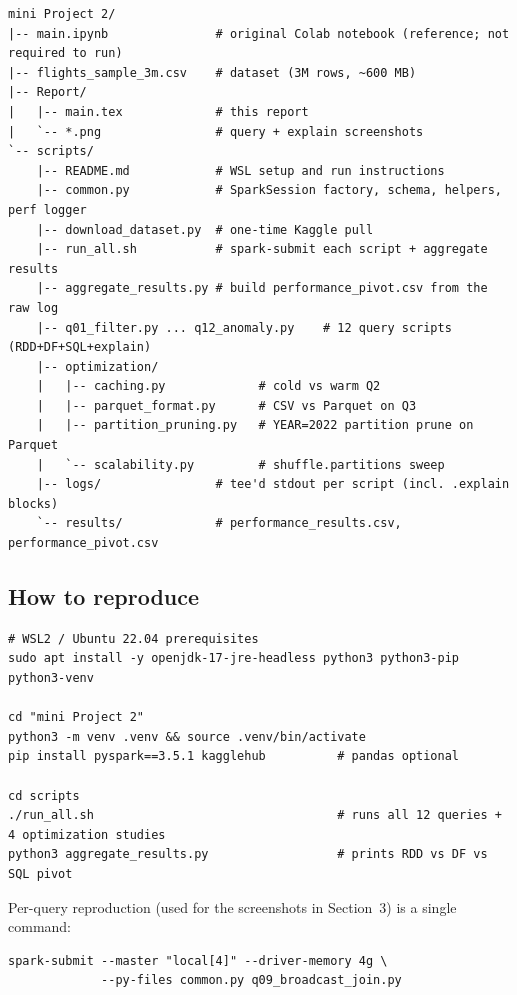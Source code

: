 \documentclass{article}
\begin{document}
\begin{footnotesize}
\begin{verbatim}
mini Project 2/
|-- main.ipynb               # original Colab notebook (reference; not required to run)
|-- flights_sample_3m.csv    # dataset (3M rows, ~600 MB)
|-- Report/
|   |-- main.tex             # this report
|   `-- *.png                # query + explain screenshots
`-- scripts/
    |-- README.md            # WSL setup and run instructions
    |-- common.py            # SparkSession factory, schema, helpers, perf logger
    |-- download_dataset.py  # one-time Kaggle pull
    |-- run_all.sh           # spark-submit each script + aggregate results
    |-- aggregate_results.py # build performance_pivot.csv from the raw log
    |-- q01_filter.py ... q12_anomaly.py    # 12 query scripts (RDD+DF+SQL+explain)
    |-- optimization/
    |   |-- caching.py             # cold vs warm Q2
    |   |-- parquet_format.py      # CSV vs Parquet on Q3
    |   |-- partition_pruning.py   # YEAR=2022 partition prune on Parquet
    |   `-- scalability.py         # shuffle.partitions sweep
    |-- logs/                # tee'd stdout per script (incl. .explain blocks)
    `-- results/             # performance_results.csv, performance_pivot.csv
\end{verbatim}
\end{footnotesize}

\subsection*{How to reproduce}

\begin{footnotesize}
\begin{verbatim}
# WSL2 / Ubuntu 22.04 prerequisites
sudo apt install -y openjdk-17-jre-headless python3 python3-pip python3-venv

cd "mini Project 2"
python3 -m venv .venv && source .venv/bin/activate
pip install pyspark==3.5.1 kagglehub          # pandas optional

cd scripts
./run_all.sh                                  # runs all 12 queries + 4 optimization studies
python3 aggregate_results.py                  # prints RDD vs DF vs SQL pivot
\end{verbatim}
\end{footnotesize}

\noindent Per-query reproduction (used for the screenshots in Section~3) is a single command:

\begin{footnotesize}
\begin{verbatim}
spark-submit --master "local[4]" --driver-memory 4g \
             --py-files common.py q09_broadcast_join.py
\end{verbatim}
\end{footnotesize}
\end{document}

